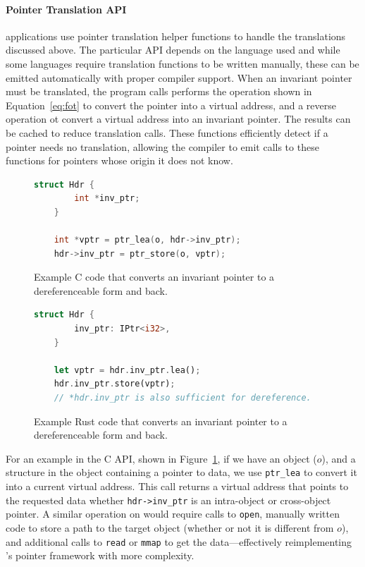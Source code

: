 \paragraph{Pointer Translation API}

\Twizzler applications use pointer translation helper functions to handle the
translations discussed above. The particular API depends on the language used and while some languages require
translation functions to be written manually, these can be emitted automatically with proper compiler support.
When an invariant pointer must be
translated, the program calls performs the operation shown in Equation~\ref{eq:fot} to convert the pointer into a
virtual address, and a reverse operation ot convert a virtual address into an invariant pointer.
The results can be cached to reduce translation calls.
These functions efficiently detect if a pointer needs no translation,
allowing the compiler to emit calls to these functions for pointers whose
origin it does not know.



\begin{figure}
    \hspace*{-2.6cm}
    \begin{lstlisting}[language=C]
    struct Hdr {
        int *inv_ptr;
    }

    int *vptr = ptr_lea(o, hdr->inv_ptr);
    hdr->inv_ptr = ptr_store(o, vptr);
\end{lstlisting}
    \caption[Invariant pointer C example]{Example C code that converts an invariant pointer to a dereferenceable form and back.}
    \label{fig:cex}
\end{figure}

\begin{figure}
    \begin{lstlisting}[language=Rust]
    struct Hdr {
        inv_ptr: IPtr<i32>,
    }

    let vptr = hdr.inv_ptr.lea();
    hdr.inv_ptr.store(vptr);
    // *hdr.inv_ptr is also sufficient for dereference.
\end{lstlisting}
    \caption[Invariant pointer Rust example]{Example Rust code that converts an invariant pointer to a dereferenceable form and back.}
    \label{fig:rustex}
\end{figure}

For an example in the C API, shown in Figure~\ref{fig:cex}, if we have
an object ($o$), and a structure in
the object containing a pointer to data,
we use
\texttt{ptr\_lea} to convert it into a current virtual address.
This call returns a virtual address that points to the requested
data whether \texttt{hdr->inv\_ptr} is an intra-object or cross-object pointer.
A similar operation on \unix would require calls to \texttt{open}, manually
written code to store a path to the target object (whether or not it is
different from $o$), and additional calls to \texttt{read} or \texttt{mmap} to
get the data---effectively reimplementing \Twizzler's pointer
framework with more complexity.

